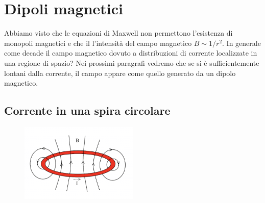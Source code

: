 \section{Dipoli magnetici}

Abbiamo visto che le equazioni di Maxwell non permettono l'esistenza di monopoli magnetici e che il l'intensit\`a del campo magnetico $B \sim 1/r^2$. In generale come decade il campo magnetico dovuto a distribuzioni di corrente localizzate in una regione di spazio? Nei prossimi paragrafi vedremo che se si \`e sufficientemente lontani dalla corrente, il campo appare come quello generato da un dipolo magnetico.

\subsection{Corrente in una spira circolare}

\begin{figure} %
    \centering
    \includegraphics[width=0.5\textwidth]{images/spire1}
\end{figure}

